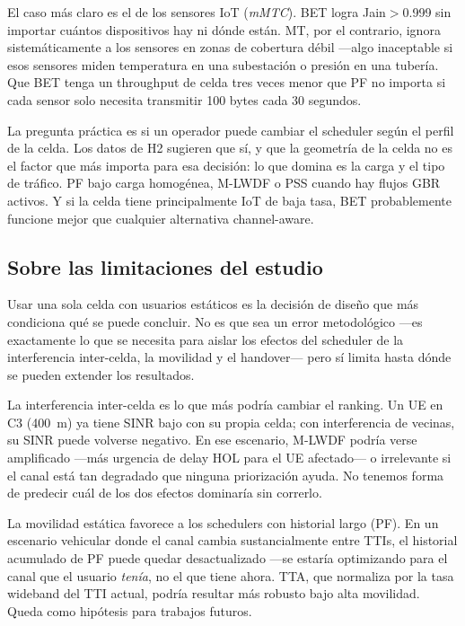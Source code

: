 \documentclass[conference]{IEEEtran}
\begin{document}
El caso más claro es el de los sensores IoT (\emph{mMTC}). BET logra Jain$>$0.999
sin importar cuántos dispositivos hay ni dónde están. MT, por el contrario, ignora
sistemáticamente a los sensores en zonas de cobertura débil ---algo inaceptable si
esos sensores miden temperatura en una subestación o presión en una tubería. Que
BET tenga un throughput de celda tres veces menor que PF no importa si cada sensor
solo necesita transmitir 100 bytes cada 30 segundos.

La pregunta práctica es si un operador puede cambiar el scheduler según el perfil
de la celda. Los datos de H2 sugieren que sí, y que la geometría de la celda no
es el factor que más importa para esa decisión: lo que domina es la carga y el
tipo de tráfico. PF bajo carga homogénea, M-LWDF o PSS cuando hay flujos GBR
activos. Y si la celda tiene principalmente IoT de baja tasa, BET probablemente
funcione mejor que cualquier alternativa channel-aware.

\subsection{Sobre las limitaciones del estudio}

Usar una sola celda con usuarios estáticos es la decisión de diseño que más
condiciona qué se puede concluir. No es que sea un error metodológico ---es
exactamente lo que se necesita para aislar los efectos del scheduler de la
interferencia inter-celda, la movilidad y el handover--- pero sí limita hasta
dónde se pueden extender los resultados.

La interferencia inter-celda es lo que más podría cambiar el ranking. Un UE en
C3 (400~m) ya tiene SINR bajo con su propia celda; con interferencia de vecinas,
su SINR puede volverse negativo. En ese escenario, M-LWDF podría verse amplificado
---más urgencia de delay HOL para el UE afectado--- o irrelevante si el canal está
tan degradado que ninguna priorización ayuda. No tenemos forma de predecir cuál
de los dos efectos dominaría sin correrlo.

La movilidad estática favorece a los schedulers con historial largo (PF). En
un escenario vehicular donde el canal cambia sustancialmente entre TTIs, el
historial acumulado de PF puede quedar desactualizado ---se estaría optimizando
para el canal que el usuario \emph{tenía}, no el que tiene ahora. TTA, que
normaliza por la tasa wideband del TTI actual, podría resultar más robusto
bajo alta movilidad. Queda como hipótesis para trabajos futuros.
\end{document}

